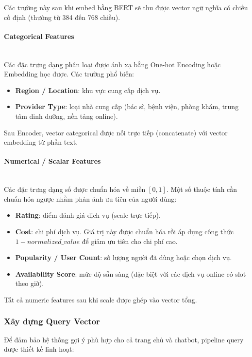 Các trường này sau khi embed bằng BERT sẽ thu được vector ngữ nghĩa có chiều cố định (thường từ 384 đến 768 chiều).

\paragraph{Categorical Features} \\
Các đặc trưng dạng phân loại được ánh xạ bằng One-hot Encoding hoặc Embedding học được. Các trường phổ biến:
\begin{itemize}
    \item \textbf{Region / Location}: khu vực cung cấp dịch vụ.
    \item \textbf{Provider Type}: loại nhà cung cấp (bác sĩ, bệnh viện, phòng khám, trung tâm dinh dưỡng, nền tảng online).
\end{itemize}

Sau Encoder, vector categorical được nối trực tiếp (concatenate) với vector embedding từ phần text.

\paragraph{Numerical / Scalar Features} \\
Các đặc trưng dạng số được chuẩn hóa về miền \([0, 1]\). Một số thuộc tính cần chuẩn hóa ngược nhằm phản ánh ưu tiên của người dùng:
\begin{itemize}
    \item \textbf{Rating}: điểm đánh giá dịch vụ (scale trực tiếp).
    \item \textbf{Cost}: chi phí dịch vụ. Giá trị này được chuẩn hóa rồi áp dụng công thức $1 - normalized\_value$ để giảm ưu tiên cho chi phí cao.
    \item \textbf{Popularity / User Count}: số lượng người đã dùng hoặc chọn dịch vụ.
    \item \textbf{Availability Score}: mức độ sẵn sàng (đặc biệt với các dịch vụ online có slot theo giờ).
\end{itemize}

Tất cả numeric features sau khi scale được ghép vào vector tổng.

\subsubsection{Xây dựng Query Vector}

Để đảm bảo hệ thống gợi ý phù hợp cho cả trang chủ và chatbot, pipeline query được thiết kế linh hoạt:

